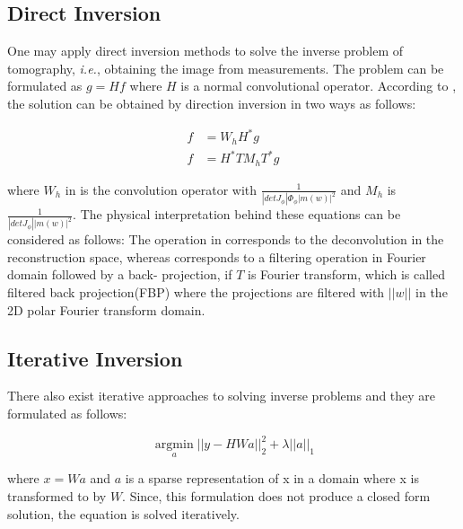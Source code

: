 \documentclass[journal, onecolumn, 11pt]{IEEEtran}
\begin{document}
\subsection{Direct Inversion}

One may apply direct inversion methods to solve the inverse problem of tomography, \textit{i.e.}, obtaining the image from measurements. The problem can be formulated as $g=Hf$ where $H$ is a normal convolutional operator. According to \cite{FBPConvNet}, the solution can be obtained by direction inversion in two ways as follows: 

\begin{align}
    f &= W_h H^\ast g \label{eq:inv1}\\
    f &= H^\ast T M_h T^\ast g \label{eq:inv2}
\end{align}

where $W_h$ in  is the convolution operator with $\frac{1}{|det J_\phi|\Phi_\phi|m(w)|^2}$ and $M_h$ is $\frac{1}{|det J_\phi||m(w)|^2}$. The physical interpretation behind these equations can be considered as follows: The operation in  corresponds to the deconvolution in the reconstruction space, whereas  corresponds to a filtering operation in Fourier domain followed by a back- projection, if $T$ is Fourier transform, which is called filtered back projection(FBP) where the projections are filtered with $||w||$ in the 2D polar Fourier transform domain. 

\subsection{Iterative Inversion}

There also exist iterative approaches to solving inverse problems and they are formulated as follows: 

\begin{equation}
    \operatorname*{argmin}_a ||y-HWa||_2^2 + \lambda ||a||_1 
    \label{eq:TV}
\end{equation}

where $x = Wa$ and $a$ is a sparse representation of x in a domain where x is transformed to by $W$. Since, this formulation does not produce a closed form solution, the equation is solved iteratively. 
\end{document}
